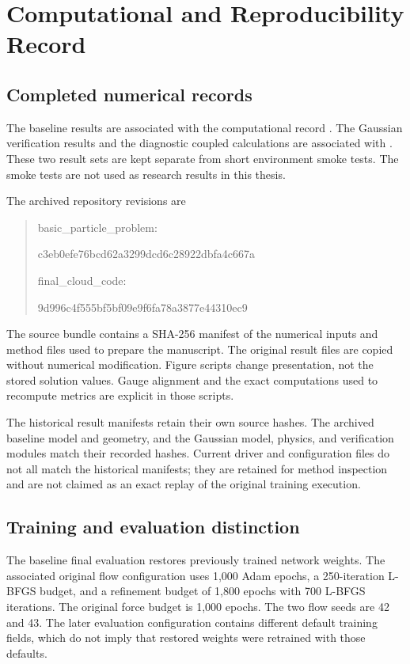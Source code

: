 \chapter{Computational and Reproducibility Record}\label{app:reproducibility}

\section{Completed numerical records}
The baseline results are associated with the computational record
. The Gaussian
verification results and the diagnostic coupled calculations are associated
with . These two result
sets are kept separate from short environment smoke tests. The smoke tests
are not used as research results in this thesis.

The archived repository revisions are
\begin{quote}\small\ttfamily
basic\_particle\_problem:\par
c3eb0efe76bcd62a3299dcd6c28922dbfa4c667a\par\medskip
final\_cloud\_code:\par
9d996c4f555bf5bf09e9f6fa78a3877e44310ec9
\end{quote}
The source bundle contains a SHA-256 manifest of the numerical inputs and
method files used to prepare the manuscript. The original result files are
copied without numerical modification. Figure scripts change presentation,
not the stored solution values. Gauge alignment and the exact computations
used to recompute metrics are explicit in those scripts.

The historical result manifests retain their own source hashes. The
archived baseline model and geometry, and the Gaussian model, physics, and
verification modules match their recorded hashes. Current driver and
configuration files do not all match the historical manifests; they are
retained for method inspection and are not claimed as an exact replay of
the original training execution.

\section{Training and evaluation distinction}
The baseline final evaluation restores previously trained network weights.
The associated original flow configuration uses 1,000 Adam epochs, a
250-iteration L-BFGS budget, and a refinement budget of 1,800 epochs with
700 L-BFGS iterations. The original force budget is 1,000 epochs. The two
flow seeds are 42 and 43. The later evaluation configuration contains
different default training fields, which do not imply that restored weights
were retrained with those defaults.

